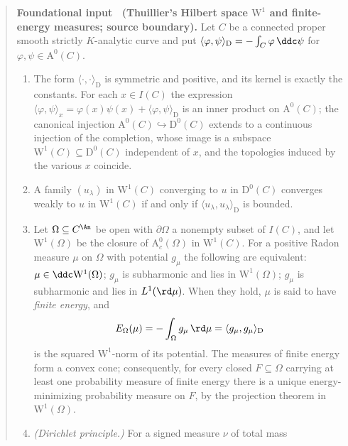 \label{thm:ch26-thuillier-w1}
\begin{quote}
\textbf{Foundational input \thetheorem\ (Thuillier's Hilbert space
\(\mathrm W^1\) and finite-energy measures; source boundary).}
Let \(C\) be a connected proper smooth strictly \(K\)-analytic curve and put
\(\langle\varphi,\psi\rangle_{\mathrm D}=-\int_C\varphi\,\ddc\psi\) for
\(\varphi,\psi\in\mathrm A^0(C)\).
\begin{enumerate}
\item\label{itm:ch26-thu:hilbert}
 The form \(\langle\cdot,\cdot\rangle_{\mathrm D}\) is symmetric and
 positive, and its kernel is exactly the constants.  For each
 \(x\in I(C)\) the expression
 \(\langle\varphi,\psi\rangle_x=\varphi(x)\psi(x)
   +\langle\varphi,\psi\rangle_{\mathrm D}\)
 is an inner product on \(\mathrm A^0(C)\); the canonical injection
 \(\mathrm A^0(C)\hookrightarrow\mathrm D^0(C)\) extends to a continuous
 injection of the completion, whose image is a subspace
 \(\mathrm W^1(C)\subseteq\mathrm D^0(C)\) independent of \(x\), and the
 topologies induced by the various \(x\) coincide.
\item\label{itm:ch26-thu:criterion}
 A family \((u_\lambda)\) in \(\mathrm W^1(C)\) converging to \(u\) in
 \(\mathrm D^0(C)\) converges weakly to \(u\) in \(\mathrm W^1(C)\) if and
 only if \(\langle u_\lambda,u_\lambda\rangle_{\mathrm D}\) is bounded.
\item\label{itm:ch26-thu:energy}
 Let \(\Omega\subseteq C^{\An}\) be open with \(\partial\Omega\) a nonempty
 subset of \(I(C)\), and let \(\mathrm W^1(\Omega)\) be the closure of
 \(\mathrm A^0_c(\Omega)\) in \(\mathrm W^1(C)\).  For a positive Radon
 measure \(\mu\) on \(\Omega\) with potential \(g_\mu\) the following are
 equivalent: \(\mu\in\ddc\mathrm W^1(\Omega)\); \(g_\mu\) is subharmonic and
 lies in \(\mathrm W^1(\Omega)\); \(g_\mu\) is subharmonic and lies in
 \(L^1(\rd\mu)\).  When they hold, \(\mu\) is said to have \emph{finite
 energy}, and
 \[
  E_\Omega(\mu)=-\int_\Omega g_\mu\,\rd\mu
   =\langle g_\mu,g_\mu\rangle_{\mathrm D}
 \]
 is the squared \(\mathrm W^1\)-norm of its potential.  The measures of
 finite energy form a convex cone; consequently, for every closed
 \(F\subseteq\Omega\) carrying at least one probability measure of finite
 energy there is a unique energy-minimizing probability measure on \(F\), by
 the projection theorem in \(\mathrm W^1(\Omega)\).
\item\label{itm:ch26-thu:dirichlet-principle}
 \emph{(Dirichlet principle.)}  For a signed measure \(\nu\) of total mass

\end{enumerate}
\end{quote}
